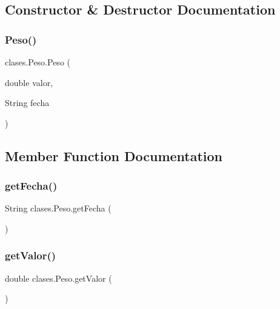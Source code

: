 \subsection{Constructor \& Destructor Documentation}
\mbox{\label{classclases_1_1_peso_a25ffe8b256b58b356e0534d2aa67d0e3}} 
\subsubsection{\texorpdfstring{Peso()}{Peso()}}
{\footnotesize\ttfamily clases.\+Peso.\+Peso (\begin{DoxyParamCaption}\item[{double}]{valor,  }\item[{String}]{fecha }\end{DoxyParamCaption})}



\subsection{Member Function Documentation}
\mbox{\label{classclases_1_1_peso_afbe5ae3ccb31533c1bb7782c869a4e93}} 
\subsubsection{\texorpdfstring{get\+Fecha()}{getFecha()}}
{\footnotesize\ttfamily String clases.\+Peso.\+get\+Fecha (\begin{DoxyParamCaption}{ }\end{DoxyParamCaption})}

\mbox{\label{classclases_1_1_peso_a1a515ee0df44d235337949f360ddd60a}} 
\subsubsection{\texorpdfstring{get\+Valor()}{getValor()}}
{\footnotesize\ttfamily double clases.\+Peso.\+get\+Valor (\begin{DoxyParamCaption}{ }\end{DoxyParamCaption})}


